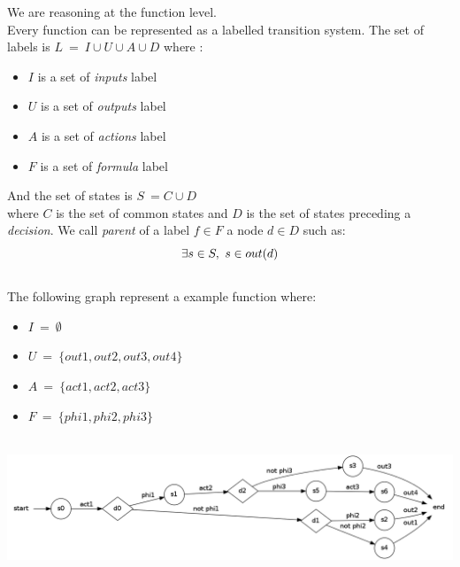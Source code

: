 \documentclass[a4paper]{report}
\begin{document}
We are reasoning at the function level.\\
Every function can be represented as a labelled transition system. The set of labels is $L\ =\ I \cup U \cup A \cup D$ where :\\
\begin{itemize}
\item $I$ is a set of \textit{inputs} label
\item $U$ is a set of \textit{outputs} label
\item $A$ is a set of \textit{actions} label
\item $F$ is a set of \textit{formula} label
\end{itemize}
And the set of states is $S\ = C \cup D$\\
where $C$ is the set of common states and $D$ is the set of states preceding a \textit{decision}.
We call \textit{parent} of a label $f \in F$ a node $d \in D$ such as:\\
\[
\exists s \in S,\ s \in out(d)\\
\]
$ $\\
\newline
The following graph represent a example function where:
\begin{itemize}
\item $I\ =\ \emptyset$
\item $U\ =\ \{out1, out2, out3, out4\}$
\item $A\ =\ \{act1, act2, act3\}$
\item $F\ =\ \{phi1, phi2, phi3\}$
\end{itemize}
$ $\\
\includegraphics[scale=0.3]{../graphviz/LTSExample.png}
$ $\\
\newline
\end{document}
